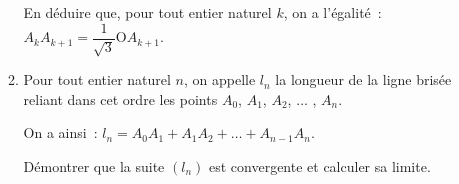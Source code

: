 \begin{enumerate}
\begin{enumerate}[label=\alph*.]
          \par
          En déduire que, pour tout entier naturel $k$, on a l'égalité~: $A_kA_{k+1} = \dfrac{1}{\sqrt{3}} \text{O}A_{k+1}$.
          \item Pour tout entier naturel $n$, on appelle $l_n$ la longueur de la ligne brisée reliant dans cet ordre les points $A_0$,\: $A_1$,\: $A_2$, $\ldots$ , $A_n$.
          \par
          On a ainsi~: $l_n = A_0A_1 + A_1A_2 + \ldots + A_{n-1}A_n$.
          \par
          Démontrer que la suite $\left(l_n\right)$ est convergente et calculer sa limite.
     \end{enumerate}
\end{enumerate}
